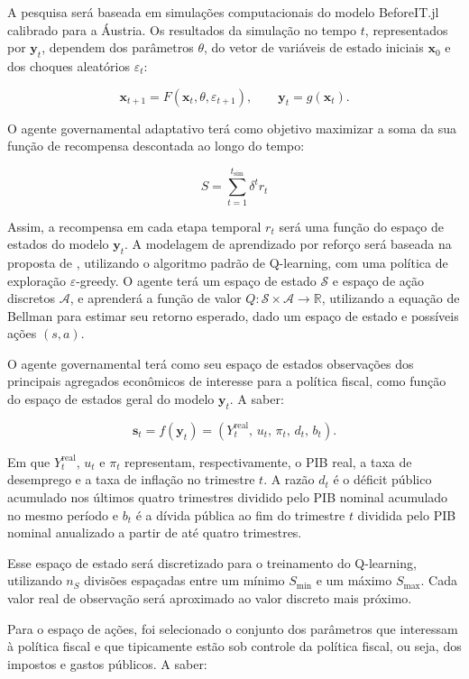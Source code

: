 \documentclass[12pt,a4paper]{article}
\let\cite\citep
\begin{document}
A pesquisa será baseada em simulações computacionais do modelo BeforeIT.jl calibrado para a Áustria. Os resultados da simulação no tempo \(t\), representados por \(\mathbf{y}_{t}\), dependem dos parâmetros \(\theta\), do vetor de variáveis de estado
iniciais \(\mathbf{x}_0\) e dos choques aleatórios \(\varepsilon_{t}\):

\[
\mathbf{x}_{t+1}=F(\mathbf{x}_t,\theta,\varepsilon_{t+1}),
\qquad
\mathbf{y}_t=g(\mathbf{x}_t).
\]

O agente governamental adaptativo terá como objetivo maximizar a soma da sua função de recompensa descontada ao longo do tempo:

\[
S = \sum_{t=1}^{t_{\mathrm{sim}}} \delta^t r_{t}
\]

Assim, a recompensa em cada etapa temporal \(r_{t}\) será uma função do espaço de estados do modelo \(\mathbf{y}_{t}\). A modelagem de aprendizado por reforço será baseada na proposta de \cite{brusatin2024}, utilizando o algoritmo padrão de Q-learning, com uma política de exploração \(\varepsilon\)-greedy. O agente terá um espaço de estado \(\mathcal{S}\) e espaço de ação discretos \(\mathcal{A}\), e aprenderá a função de valor \(Q : \mathcal{S} \times \mathcal{A} \to \mathbb{R}\), utilizando a equação de Bellman para estimar seu retorno esperado, dado um espaço de estado e possíveis ações \((s,a)\).

O agente governamental terá como seu espaço de estados observações dos principais agregados econômicos de interesse para a política fiscal, como função do espaço de estados geral do modelo \(\mathbf{y}_{t}\). A saber: 

\[
\mathbf{s}_t = f(\mathbf{y}_t)
= \left(Y_t^{\mathrm{real}},\, u_t,\, \pi_t,\, d_t,\, b_t\right).
\]


Em que \(Y_t^{\mathrm{real}}\), \(u_t\) e \(\pi_t\) representam, respectivamente, o PIB real, a taxa de desemprego e a taxa de inflação no trimestre \(t\). A razão \(d_t\) é o déficit público acumulado nos últimos quatro trimestres dividido pelo PIB nominal acumulado no mesmo período e \(b_t\) é a dívida pública ao fim do trimestre \(t\) dividida pelo PIB nominal anualizado a partir de até quatro trimestres.

Esse espaço de estado será discretizado para o treinamento do Q-learning, utilizando \(n_S\) divisões espaçadas entre um mínimo \(S_{\min}\) e um máximo \(S_{\max}\). Cada valor real de observação será aproximado ao valor discreto mais próximo.

Para o espaço de ações, foi selecionado o conjunto dos parâmetros que interessam à política fiscal e que tipicamente estão sob controle da política fiscal, ou seja, dos impostos e gastos públicos. A saber:
\end{document}
